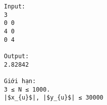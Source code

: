 \begin{verbatim}
Input:
3
0 0
4 0
0 4

Output:
2.82842

Giới hạn:
3 ≤ N ≤ 1000. 
|$x_{u}$|, |$y_{u}$| ≤ 30000

\end{verbatim}